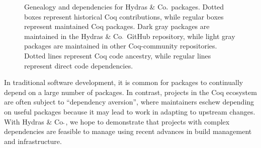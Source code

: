 \documentclass{easychair}
\newcommand{\community}{Coq-community\xspace}
\newcommand{\Hydras}{Hydras \& Co$\text.$\xspace}
\begin{document}
\begin{figure}[ht]
{
}
\caption{Genealogy and dependencies for \Hydras packages. Dotted boxes represent historical Coq contributions, while regular boxes represent maintained Coq packages. Dark gray packages are maintained in the \Hydras GitHub repository, while light gray packages are maintained in other \community repositories. Dotted lines represent Coq code ancestry, while regular lines represent direct code dependencies.}
  \label{fig:genealogy}
\end{figure}

In traditional software development, it is common for packages to continually depend on a large number of packages. In contrast, projects in the Coq ecosystem are often subject to ``dependency aversion'', where maintainers eschew depending on useful packages because it may lead to work in adapting to upstream changes. With \Hydras, we hope to demonstrate that projects with complex dependencies are feasible to manage using recent advances in build management and infrastructure.
\end{document}
